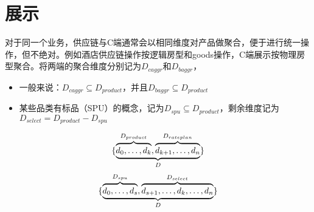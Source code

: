 \documentclass[a4paper]{article}
\begin{document}
\section{展示}

对于同一个业务，供应链与C端通常会以相同维度对产品做聚合，便于进行统一操作，但不绝对。例如酒店供应链操作按逻辑房型和goods操作，C端展示按物理房型聚合。将两端的聚合维度分别记为$D_{caggr}$和$D_{baggr}$，
\begin{itemize}
    \item 一般来说：$D_{caggr} \subseteq D_{product}$，并且$D_{baggr} \subseteq D_{product}$
    \item 某些品类有标品（SPU）的概念，记为$D_{spu} \subseteq D_{product}$，剩余维度记为$D_{select}=D_{product}-D_{spu}$
\end{itemize}
\begin{equation}
    \{\underbrace{%
        \overbrace{\mathstrut d_0,\ldots,d_k}^{D_{product}},
        \overbrace{\mathstrut d_{k+1},\ldots,d_n}^{D_{rateplan}}
    }
    _{D} \}
\end{equation}
\begin{equation}
    \{\underbrace{%
        \overbrace{\mathstrut d_0,\ldots,d_s}^{D_{spu}},
        \overbrace{\mathstrut d_{s+1},\ldots,d_k,\ldots,d_n}^{D_{select}}
    }
    _{D} \}
\end{equation}
\end{document}
